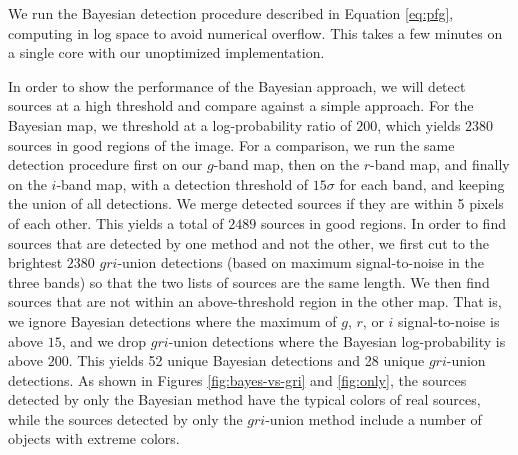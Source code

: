 \documentclass[11pt,letterpaper,linenumbers]{aastex63}
\begin{document}
We run the Bayesian detection procedure described in Equation
\ref{eq:pfg}, computing in log space to avoid numerical overflow.
This takes a few minutes on a single core with our unoptimized
implementation.

In order to show the performance of the Bayesian approach, we will
detect sources at a high threshold and compare against a simple
approach.  For the Bayesian map, we threshold at a log-probability
ratio of $200$, which yields $2380$ sources in good regions of the
image.  For a comparison, we run the same detection procedure first on
our $g$-band map, then on the $r$-band map, and finally on the
$i$-band map, with a detection threshold of $15 \sigma$ for each band,
and keeping the union of all detections.  We merge detected sources if
they are within 5 pixels of each other.  This yields a total of $2489$
sources in good regions.  In order to find sources that are detected
by one method and not the other, we first cut to the brightest $2380$
$gri$-union detections (based on maximum signal-to-noise in the three
bands) so that the two lists of sources are the same length.  We then
find sources that are not within an above-threshold region in the
other map.  That is, we ignore Bayesian detections where the maximum
of $g$, $r$, or $i$ signal-to-noise is above $15$, and we drop
$gri$-union detections where the Bayesian log-probability is above
$200$.  This yields 52 unique Bayesian detections and 28 unique
$gri$-union detections.  As shown in Figures \ref{fig:bayes-vs-gri}
and \ref{fig:only}, the sources detected by only the Bayesian method
have the typical colors of real sources, while the sources detected by
only the $gri$-union method include a number of objects with extreme colors.

\end{document}
